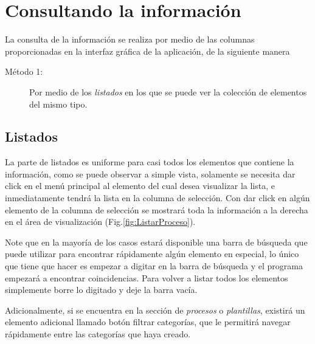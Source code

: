 \chapter{Consultando la informaci\'on}
\label{sec:consultandoLaInformacion}
La consulta de la informaci\'on se realiza por medio de las columnas proporcionadas en la interfaz gr\'afica de la aplicaci\'on, de la siguiente manera

\begin{description}
  \item[M\'etodo 1:]Por medio de los \emph{listados} en los que se puede ver la
  colecci\'on de elementos del mismo tipo.
  
\end{description}

\section{Listados}
La parte de listados es uniforme para casi todos los elementos que contiene la informaci\'on, como se puede observar a simple vista, solamente se necesita dar click en el men\'u principal al elemento del cual desea visualizar la lista, e inmediatamente tendr\'a la lista en la columna de selecci\'on. Con dar click en alg\'un elemento de la columna de selecci\'on se mostrar\'a toda la informaci\'on a la derecha en el \'area de visualizaci\'on (Fig.\ref{fig:ListarProceso}). 


Note que en la mayor\'ia de los casos estar\'a disponible una barra de b\'usqueda que puede utilizar para encontrar r\'apidamente alg\'un elemento en especial, lo \'unico que tiene que hacer es empezar a digitar en la barra de b\'usqueda y el programa empezar\'a a encontrar coincidencias. Para volver a listar todos los elementos simplemente borre lo digitado y deje la barra vac\'ia.


Adicionalmente, si se encuentra en la secci\'on de \emph{procesos} o \emph{plantillas}, existir\'a un elemento adicional llamado bot\'on filtrar categor\'ias, que le permitir\'a navegar r\'apidamente entre las categor\'ias que haya creado.




